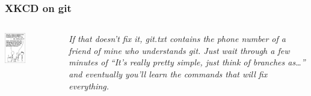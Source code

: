 \documentclass[10pt,svgnames,handout]{beamer}
\begin{document}
\begin{frame}
\label{xkcd_git}
\frametitle{XKCD on git \hfill\hyperlink{git_cons}{}}

\begin{columns}[T,onlytextwidth]
\includegraphics[width=0.4\textwidth]{figures/xkcd-git.png}

\emph{If that doesn't fix it, git.txt contains the phone number of a friend of mine who understands git.
Just wait through a few minutes of “It's really pretty simple, just think of branches as\ldots” and eventually you'll learn the commands that will fix everything.
}
\end{columns}

\end{frame}
\end{document}
